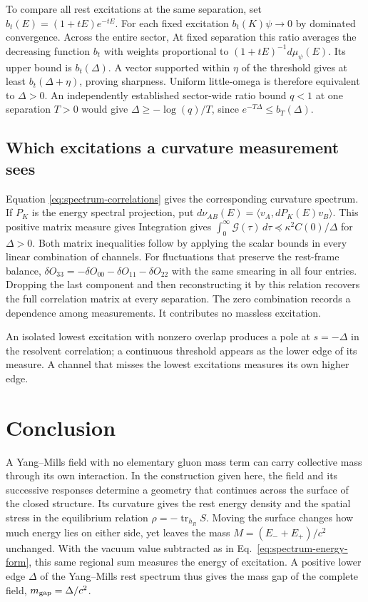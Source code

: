 To compare all rest excitations at the same separation, set \(b_t(E)=(1+tE)e^{-tE}\). For each fixed excitation \(b_t(K)\psi\to0\) by dominated convergence. Across the entire sector,
\SpectrumUniformDisplay
At fixed separation this ratio averages the decreasing function \(b_t\) with weights proportional to \((1+tE)^{-1}d\mu_\psi(E)\). Its upper bound is \(b_t(\Delta)\). A vector supported within \(\eta\) of the threshold gives at least \(b_t(\Delta+\eta)\), proving sharpness. Uniform little-omega is therefore equivalent to \(\Delta>0\). An independently established sector-wide ratio bound \(q<1\) at one separation \(T>0\) would give \(\Delta\ge-\log(q)/T\), since \(e^{-T\Delta}\le b_T(\Delta)\). 

\subsection{Which excitations a curvature measurement sees}

Equation \eqref{eq:spectrum-correlations} gives the corresponding curvature spectrum. If \(P_K\) is the energy spectral projection, put \(d\nu_{AB}(E)=\langle v_A,dP_K(E)v_B\rangle\). This positive matrix measure gives
\SpectrumCurvatureBoundsDisplay
Integration gives \(\int_0^\infty\mathscr G(\tau)\,d\tau\preceq\kappa^2 C(0)/\Delta\) for \(\Delta>0\). Both matrix inequalities follow by applying the scalar bounds in every linear combination of channels. For fluctuations that preserve the rest-frame balance, \(\delta O_{33}=-\delta O_{00}-\delta O_{11}-\delta O_{22}\) with the same smearing in all four entries. Dropping the last component and then reconstructing it by this relation recovers the full correlation matrix at every separation. The zero combination records a dependence among measurements. It contributes no massless excitation.

An isolated lowest excitation with nonzero overlap produces a pole at \(s=-\Delta\) in the resolvent correlation; a continuous threshold appears as the lower edge of its measure. A channel that misses the lowest excitations measures its own higher edge.

\section{Conclusion}
A Yang--Mills field with no elementary gluon mass term can carry
collective mass through its own interaction. In the construction given
here, the field and its successive responses determine a geometry that
continues across the surface of the closed structure. Its curvature
gives the rest energy density and the spatial stress in the equilibrium
relation \(\rho=-\operatorname{tr}_{h_R}S\). Moving the surface changes
how much energy lies on either side, yet leaves the mass
\(M=(E_-+E_+)/c^2\) unchanged. With the vacuum value subtracted as in
Eq.~\eqref{eq:spectrum-energy-form}, this same regional sum measures
the energy of excitation. A positive lower edge \(\Delta\) of the
Yang--Mills rest spectrum thus gives the mass gap of the complete
field, \(m_{\rm gap}=\Delta/c^2\).
